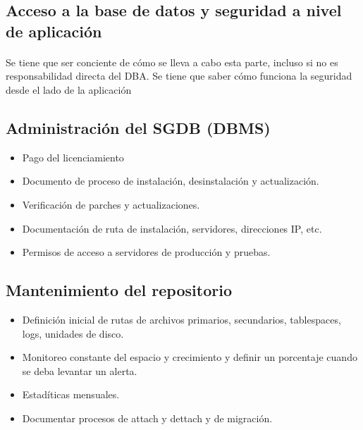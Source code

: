 \documentclass{article}
\begin{document}
\paragraph{}

\subsection{Acceso a la base de datos y seguridad a nivel de aplicación}
\paragraph{}
Se tiene que ser conciente de cómo se lleva a cabo esta parte, incluso si
no es responsabilidad directa del DBA.
Se tiene que saber cómo funciona la seguridad desde el lado de la aplicación

\subsection{Administración del SGDB (DBMS)}
\begin{itemize}
	\item
	Pago del licenciamiento
	\item
	Documento de proceso de instalación, desinstalación y actualización.
	\item
	Verificación de parches y actualizaciones.
	\item
	Documentación de ruta de instalación, servidores, direcciones IP, etc.
	\item
	Permisos de acceso a servidores de producción y pruebas.
\end{itemize}

\subsection{Mantenimiento del repositorio}
\begin{itemize}
	\item
	Definición inicial de rutas de archivos primarios, secundarios, tablespaces,
	logs, unidades de disco.

	\item
	Monitoreo constante del espacio y crecimiento y definir un porcentaje cuando
	se deba levantar un alerta.

	\item
	Estadíticas mensuales.

	\item
	Documentar procesos de attach y dettach y de migración.
\end{itemize}
\end{document}
